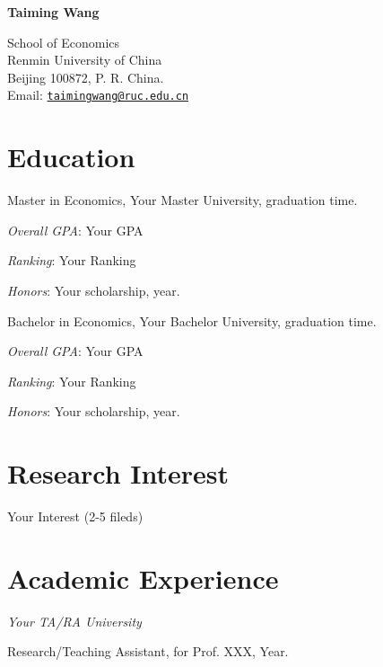 \documentclass[a4paper]{article}
\def\name{Taiming Wang}
\renewenvironment{itemize}{
  \begin{list}{}{
    \setlength{\leftmargin}{1em}
  }
}{
  \end{list}
}
\begin{document}
\centerline{\huge\bf \name}
\vspace{0.25in}
\begin{minipage}[t]{0.8\textwidth}
School of Economics\\
Renmin University of China\\
Beijing 100872, P. R. China.\\
Email: \href{mailto:taimingwang@ruc.edu.cn}{\tt taimingwang@ruc.edu.cn}\\
\end{minipage}

\section*{Education}
\begin{itemize}
\item Master in Economics, Your Master University, graduation time.
    \begin{itemize}
    \item \textit{Overall GPA}: Your GPA
    \item \textit{Ranking}: Your Ranking
    \item \textit{Honors}: Your scholarship, year.
    \end{itemize}
\item Bachelor in Economics, Your Bachelor University, graduation time.
    \begin{itemize}
    \item \textit{Overall GPA}: Your GPA
    \item \textit{Ranking}: Your Ranking
    \item \textit{Honors}: Your scholarship, year.
    \end{itemize}
\end{itemize}

\section*{Research Interest}
Your Interest (2-5 fileds)

\section*{Academic Experience}
\begin{itemize}
\item \emph{Your TA/RA University}
\begin{itemize}
\item Research/Teaching  Assistant,
  for Prof. XXX,
  Year.
\end{itemize}
\end{itemize}
\end{document}
